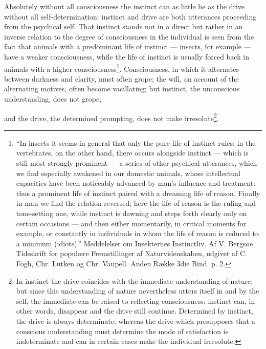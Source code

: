 \documentclass[12pt,a4paper]{book}
\begin{document}
Absolutely without all consciousness the instinct can as little be as the drive without
all self-determination: instinct and drive are both utterances proceeding from the
psychical self. That instinct stands not in a direct but rather in an inverse relation
to the degree of consciousness in the individual is seen from the fact that animals
with a predominant life of instinct --- insects, for example --- have a weaker
consciousness, while the life of instinct is usually forced back in animals with a
higher consciousness\footnote{``In insects it seems in general that only the pure life
of instinct rules; in the vertebrates, on the other hand, there occurs alongside
instinct --- which is still most strongly prominent --- a series of other psychical
utterances, which we find especially awakened in our domestic animals, whose
intellectual capacities have been noticeably advanced by man's influence and treatment:
thus a prominent life of instinct paired with a dreaming life of reason. Finally in man
we find the relation reversed; here the life of reason is the ruling and
tone-setting one, while instinct is dawning and steps forth clearly only on certain
occasions --- and then either momentarily, in critical moments for example, or
constantly in individuals in whom the life of reason is reduced to a minimum
(idiots).'' Meddelelser om Insekternes Instinctliv. Af V. Bergsøe. Tidsskrift for
populære Fremstillinger af Naturvidenskaben, udgivet af C. Fogh, Chr. Lütken og
Chr. Vaupell. Anden Række 3die Bind. p. 2.}. Consciousness, in which it alternates
between darkness and clarity, must often grope; the will, on account of the alternating
motives, often become vacillating; but instinct, the unconscious understanding, does
not grope,

\setcounter{footnote}{0}
and the drive, the determined prompting, does not make irresolute\footnote{In instinct
the drive coincides with the immediate understanding of nature; but since this
understanding of nature nevertheless utters itself in and by the self, the immediate
can be raised to reflecting consciousness: instinct can, in other words, disappear and
the drive still continue. Determined by instinct, the drive is always determinate;
whereas the drive which presupposes that a conscious understanding must determine the
mode of satisfaction is indeterminate and can in certain cases make the individual
irresolute.}.
\end{document}
